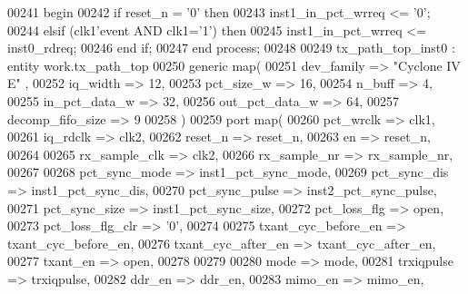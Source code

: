 \begin{DoxyCode}
00241 \textcolor{vhdlkeyword}{   begin}
00242       \textcolor{keywordflow}{if} \textcolor{vhdlchar}{reset_n} \textcolor{vhdlchar}{=} \textcolor{vhdlchar}{'}\textcolor{vhdllogic}{}\textcolor{vhdllogic}{0}\textcolor{vhdlchar}{'} \textcolor{keywordflow}{then} 
00243          inst1\_in\_pct\_wrreq <= '0';
00244       \textcolor{keywordflow}{elsif} \textcolor{vhdlchar}{(}\textcolor{vhdlchar}{clk1}\textcolor{vhdlchar}{'}\textcolor{vhdlkeyword}{event} \textcolor{keywordflow}{AND} \textcolor{vhdlchar}{clk1}\textcolor{vhdlchar}{=}\textcolor{vhdlchar}{'}\textcolor{vhdllogic}{}\textcolor{vhdllogic}{1}\textcolor{vhdlchar}{'}\textcolor{vhdlchar}{)} \textcolor{keywordflow}{then} 
00245          inst1\_in\_pct\_wrreq   <= inst0\_rdreq;   
00246       \textcolor{keywordflow}{end} \textcolor{keywordflow}{if};
00247    \textcolor{keywordflow}{end} \textcolor{keywordflow}{process};    
00248     
00249 tx\_path\_top\_inst0 : \textcolor{keywordflow}{entity} work.tx_path_top
00250    \textcolor{keywordflow}{generic} \textcolor{keywordflow}{map}( 
00251       dev_family           => \textcolor{keyword}{"Cyclone IV E"}  ,
00252       iq_width             => \textcolor{vhdllogic}{12},
00253       pct_size_w           => \textcolor{vhdllogic}{16},
00254       n_buff               => \textcolor{vhdllogic}{4},
00255       in_pct_data_w        => \textcolor{vhdllogic}{32},
00256       out_pct_data_w       => \textcolor{vhdllogic}{64},
00257       decomp_fifo_size     => \textcolor{vhdllogic}{9}
00258       \textcolor{vhdlchar}{)}
00259    \textcolor{keywordflow}{port} \textcolor{keywordflow}{map}(
00260       pct_wrclk            => clk1,
00261       iq_rdclk             => clk2,
00262       reset_n              => reset_n,
00263       en                   => reset_n,
00264 
00265       rx_sample_clk        => clk2,
00266       rx_sample_nr         => rx_sample_nr,
00267 
00268       pct_sync_mode        => inst1_pct_sync_mode,
00269       pct_sync_dis         => inst1_pct_sync_dis,
00270       pct_sync_pulse       => inst2_pct_sync_pulse,
00271       pct_sync_size        => inst1_pct_sync_size,
00272       pct_loss_flg         => \textcolor{keywordflow}{open},
00273       pct_loss_flg_clr     => '0',
00274       
00275       txant_cyc_before_en  => txant_cyc_before_en,
00276       txant_cyc_after_en   => txant_cyc_after_en,
00277       txant_en             => \textcolor{keywordflow}{open},
00278       
00279 
00280       mode                 => mode,
00281       trxiqpulse           => trxiqpulse,
00282       ddr_en               => ddr_en,
00283       mimo_en              => mimo_en,

\end{DoxyCode}
